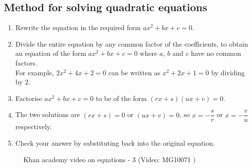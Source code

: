 \subsection*{Method for solving quadratic equations}
\begin{enumerate}[noitemsep, label=\textbf{\arabic*}. ] 
\item Rewrite the equation in the required form $ax^{2} +bx +c =0$.
\item Divide the entire equation by any common factor of the coefficients,
to obtain an equation of the form $a{x}^{2}+bx+c=0$ where $a$, $b$ and
$c$ have no common factors.
\\For example, $2{x}^{2}+4x+2=0$ can be written as
${x}^{2}+2x+1=0$ by dividing by $2$.
\item Factorise $a{x}^{2}+bx+c=0$ to be of the form $(rx+s)(ux+v)=0$.

\item The two solutions are $(rx+s)=0$ or $(ux+v)=0$, so $x = -\dfrac{s}{r}$ or $x=-\dfrac{v}{u}$ respectively.
\item Check your answer by substituting back into the original equation.
\end{enumerate}

\setcounter{subfigure}{0}
\begin{figure}[H] %
\textnormal{Khan academy video on equations - 3}\vspace{.1in} \nSolve 
\label{m39247*yt-media3}\label{m39247*yt-video3}
 { (Video:  MG10071 )}
\vspace{2pt}
\vspace{.1in}
\end{figure}

